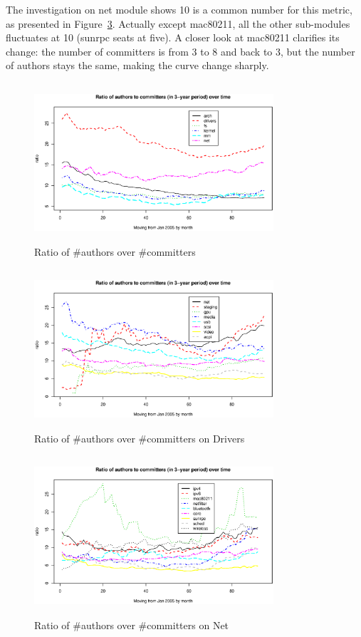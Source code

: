 \documentclass{sig-alternate-05-2015}
\begin{document}
The investigation on net module shows 10 is a common number for this metric,
as presented in Figure~\ref{fig:rationet}.
Actually except mac80211, all the other sub-modules fluctuates at 10 (sunrpc
seats at five).  A closer look at mac80211 clarifies its change:
the number of committers is from 3 to 8 and back to 3, but the number of
authors stays the same, making the curve change sharply.

\begin{figure}
\centering
\includegraphics[height=2.33in, width=3.5in]{author2committer2.eps}
\caption{Ratio of \#authors over \#committers}
\label{fig:atr2cmtr}
\end{figure}

\begin{figure}
\centering
\includegraphics[height=2.33in, width=3.5in]{atr2cmtrDRIVERS.eps}
\caption{Ratio of \#authors over \#committers on Drivers}
\label{fig:ratiodrivers}
\end{figure}

\begin{figure}
\centering
\includegraphics[height=2.33in, width=3.5in]{atr2cmtrNET.eps}
\caption{Ratio of \#authors over \#committers on Net}
\label{fig:rationet}
\end{figure}
\end{document}
